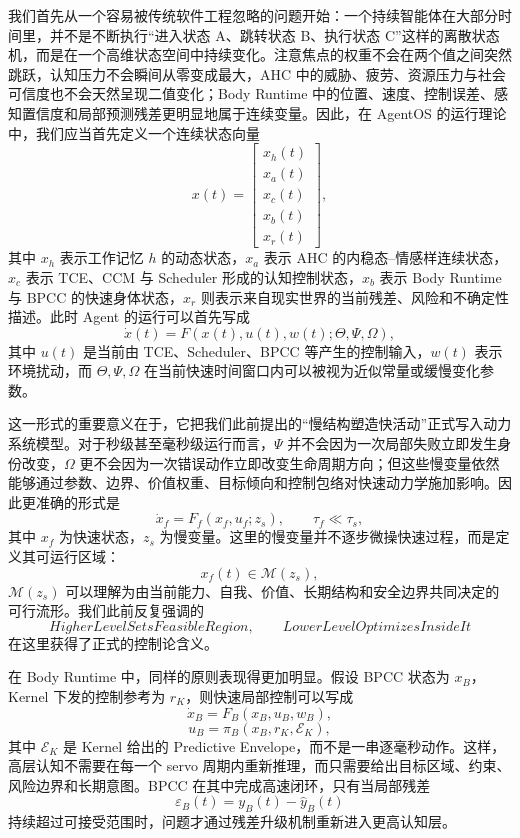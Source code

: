 我们首先从一个容易被传统软件工程忽略的问题开始：一个持续智能体在大部分时间里，并不是不断执行``进入状态 A、跳转状态 B、执行状态 C''这样的离散状态机，而是在一个高维状态空间中持续变化。注意焦点的权重不会在两个值之间突然跳跃，认知压力不会瞬间从零变成最大，AHC 中的威胁、疲劳、资源压力与社会可信度也不会天然呈现二值变化；Body Runtime 中的位置、速度、控制误差、感知置信度和局部预测残差更明显地属于连续变量。因此，在 AgentOS 的运行理论中，我们应当首先定义一个连续状态向量
\[
x(t)
=
\begin{bmatrix}
x_h(t)\\
x_a(t)\\
x_c(t)\\
x_b(t)\\
x_r(t)
\end{bmatrix},
\]
其中 $x_h$ 表示工作记忆 $h$ 的动态状态，$x_a$ 表示 AHC 的内稳态--情感样连续状态，$x_c$ 表示 TCE、CCM 与 Scheduler 形成的认知控制状态，$x_b$ 表示 Body Runtime 与 BPCC 的快速身体状态，$x_r$ 则表示来自现实世界的当前残差、风险和不确定性描述。此时 Agent 的运行可以首先写成
\[
\dot{x}(t)
=
F\left(
x(t),
u(t),
w(t);
\Theta,\Psi,\Omega
\right),
\]
其中 $u(t)$ 是当前由 TCE、Scheduler、BPCC 等产生的控制输入，$w(t)$ 表示环境扰动，而 $\Theta,\Psi,\Omega$ 在当前快速时间窗口内可以被视为近似常量或缓慢变化参数。

这一形式的重要意义在于，它把我们此前提出的``慢结构塑造快活动''正式写入动力系统模型。对于秒级甚至毫秒级运行而言，$\Psi$ 并不会因为一次局部失败立即发生身份改变，$\Omega$ 更不会因为一次错误动作立即改变生命周期方向；但这些慢变量依然能够通过参数、边界、价值权重、目标倾向和控制包络对快速动力学施加影响。因此更准确的形式是
\[
\dot{x}_f
=
F_f
\left(
x_f,
u_f;
z_s
\right),
\qquad
\tau_f\ll\tau_s,
\]
其中 $x_f$ 为快速状态，$z_s$ 为慢变量。这里的慢变量并不逐步微操快速过程，而是定义其可运行区域：
\[
x_f(t)\in\mathcal{M}(z_s),
\]
$\mathcal{M}(z_s)$ 可以理解为由当前能力、自我、价值、长期结构和安全边界共同决定的可行流形。我们此前反复强调的
\[
\boxed{
HigherLevelSetsFeasibleRegion,\qquad
LowerLevelOptimizesInsideIt
}
\]
在这里获得了正式的控制论含义。

在 Body Runtime 中，同样的原则表现得更加明显。假设 BPCC 状态为 $x_B$，Kernel 下发的控制参考为 $r_K$，则快速局部控制可以写成
\[
\dot{x}_B
=
F_B(x_B,u_B,w_B),
\]
\[
u_B
=
\pi_B
\left(
x_B,
r_K,
\mathcal{E}_K
\right),
\]
其中 $\mathcal{E}_K$ 是 Kernel 给出的 Predictive Envelope，而不是一串逐毫秒动作。这样，高层认知不需要在每一个 servo 周期内重新推理，而只需要给出目标区域、约束、风险边界和长期意图。BPCC 在其中完成高速闭环，只有当局部残差
\[
\varepsilon_B(t)
=
y_B(t)-\hat{y}_B(t)
\]
持续超过可接受范围时，问题才通过残差升级机制重新进入更高认知层。

